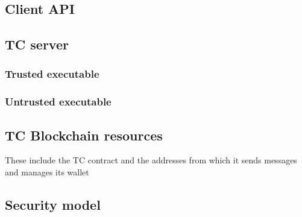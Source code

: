 \subsection{Client API}
\subsection{TC server}
\subsubsection{Trusted executable}
\subsubsection{Untrusted executable}
\subsection{TC Blockchain resources}
These include the TC contract and the addresses from which it sends messages and manages its wallet
\subsection{Security model}


